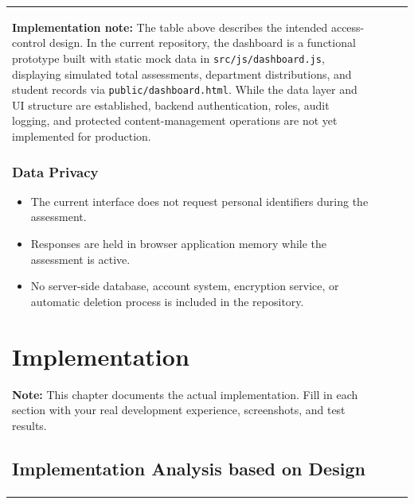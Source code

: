 \documentclass[12pt, a4paper]{article}
\begin{document}
\begin{itemize}[leftmargin=1.5em, itemsep=3pt]
\begin{table}[H]
\begin{tabularx}{\textwidth}{>{\raggedright\arraybackslash}p{0.8cm}>{\raggedright\arraybackslash}p{3.5cm}>{\raggedright\arraybackslash}X>{\raggedright\arraybackslash}p{2.5cm}}
\textbf{Implementation note:} The table above describes the intended access-control design. In the current repository, the dashboard is a functional prototype built with static mock data in \texttt{src/js/dashboard.js}, displaying simulated total assessments, department distributions, and student records via \texttt{public/dashboard.html}. While the data layer and UI structure are established, backend authentication, roles, audit logging, and protected content-management operations are not yet implemented for production.

\vspace{8pt}

\subsubsection*{Data Privacy}

\begin{itemize}[leftmargin=1.5em, itemsep=3pt]
    \item The current interface does not request personal identifiers during the assessment.
    \item Responses are held in browser application memory while the assessment is active.
    \item No server-side database, account system, encryption service, or automatic deletion process is included in the repository.
\end{itemize}

\clearpage

\newpage
\clearpage
\section{Implementation}
\begin{tcolorbox}[enhanced, colback=accentgold!10, colframe=accentgold, arc=3pt, boxrule=1pt, top=6pt, bottom=6pt]
\textbf{Note:} This chapter documents the actual implementation. Fill in each section with your real development experience, screenshots, and test results.
\end{tcolorbox}

\subsection{Implementation Analysis based on Design}


\end{tabularx}
\end{table}
\end{itemize}
\end{document}
